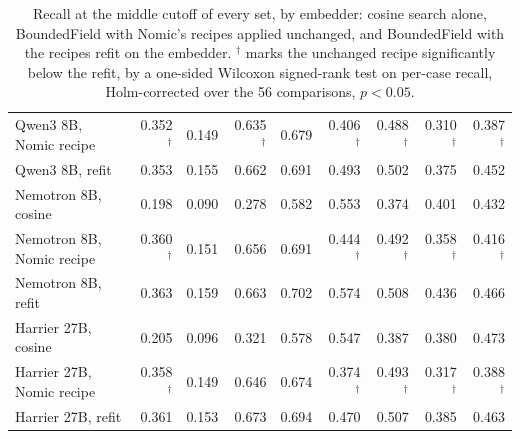 \begin{table}[!htbp]
\begin{tabular}{lrrrrrrrr}
Qwen3 8B, Nomic recipe & 0.352$^\dagger$ & 0.149 & 0.635$^\dagger$ & 0.679 & 0.406$^\dagger$ & 0.488$^\dagger$ & 0.310$^\dagger$ & 0.387$^\dagger$ \\
Qwen3 8B, refit & 0.353 & 0.155 & 0.662 & 0.691 & 0.493 & 0.502 & 0.375 & 0.452 \\
\addlinespace
Nemotron 8B, cosine & 0.198 & 0.090 & 0.278 & 0.582 & 0.553 & 0.374 & 0.401 & 0.432 \\
Nemotron 8B, Nomic recipe & 0.360$^\dagger$ & 0.151 & 0.656 & 0.691 & 0.444$^\dagger$ & 0.492$^\dagger$ & 0.358$^\dagger$ & 0.416$^\dagger$ \\
Nemotron 8B, refit & 0.363 & 0.159 & 0.663 & 0.702 & 0.574 & 0.508 & 0.436 & 0.466 \\
\addlinespace
Harrier 27B, cosine & 0.205 & 0.096 & 0.321 & 0.578 & 0.547 & 0.387 & 0.380 & 0.473 \\
Harrier 27B, Nomic recipe & 0.358$^\dagger$ & 0.149 & 0.646 & 0.674 & 0.374$^\dagger$ & 0.493$^\dagger$ & 0.317$^\dagger$ & 0.388$^\dagger$ \\
Harrier 27B, refit & 0.361 & 0.153 & 0.673 & 0.694 & 0.470 & 0.507 & 0.385 & 0.463 \\
\bottomrule
\end{tabular}
\caption{Recall at the middle cutoff of every set, by embedder: cosine search alone, BoundedField with Nomic's recipes applied unchanged, and BoundedField with the recipes refit on the embedder. $^\dagger$ marks the unchanged recipe significantly below the refit, by a one-sided Wilcoxon signed-rank test on per-case recall, Holm-corrected over the 56 comparisons, $p < 0.05$.}
\label{tab:transfer}
\end{table}
